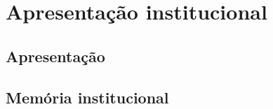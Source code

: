 \chapter*{\color{crp1}Apresentação institucional}

\section*{Apresentação}

\section*{Memória institucional}